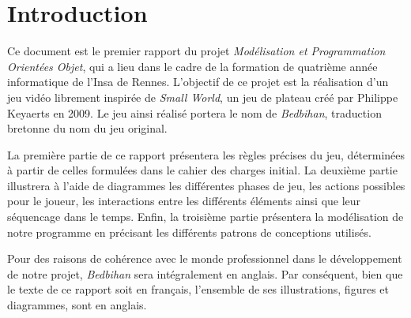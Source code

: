\section*{Introduction}
	
	Ce document est le premier rapport du projet \emph{Modélisation et Programmation Orientées Objet}, qui a lieu dans le cadre de la formation de quatrième année informatique de l'{\sc Insa} de Rennes. L'objectif de ce projet est la réalisation d'un jeu vidéo librement inspirée de \emph{Small World}, un jeu de plateau créé par Philippe Keyaerts en 2009. Le jeu ainsi réalisé portera le nom de \emph{Bedbihan}, traduction bretonne du nom du jeu original. 

	La première partie de ce rapport présentera les règles précises du jeu, déterminées à partir de celles formulées dans le cahier des charges initial. La deuxième partie illustrera à l'aide de diagrammes les différentes phases de jeu, les actions possibles pour le joueur, les interactions entre les différents éléments ainsi que leur séquencage dans le temps. Enfin, la troisième partie présentera la modélisation de notre programme en précisant les différents patrons de conceptions utilisés.
	
	Pour des raisons de cohérence avec le monde professionnel dans le développement de notre projet, \emph{Bedbihan} sera intégralement en anglais. Par conséquent, bien que le texte de ce rapport soit en français, l'ensemble de ses illustrations, figures et diagrammes, sont en anglais.






	












